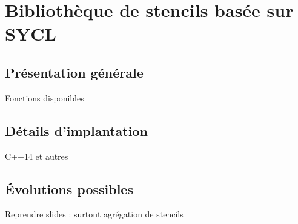 
\chapter{Bibliothèque de stencils basée sur SYCL}

\section{Présentation générale}

Fonctions disponibles

\section{Détails d'implantation}

C++14 et autres

\section{\'Evolutions possibles}

Reprendre slides : surtout agrégation de stencils

